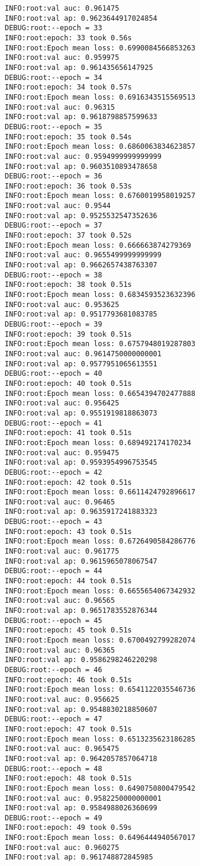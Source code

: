 \documentclass[11pt]{article}
\begin{document}
\begin{verbatim}
INFO:root:val auc: 0.961475
INFO:root:val ap: 0.9623644917024854
DEBUG:root:--epoch = 33
INFO:root:epoch: 33 took 0.56s
INFO:root:Epoch mean loss: 0.6990084566853263
INFO:root:val auc: 0.959975
INFO:root:val ap: 0.961435656147925
DEBUG:root:--epoch = 34
INFO:root:epoch: 34 took 0.57s
INFO:root:Epoch mean loss: 0.6916343515569513
INFO:root:val auc: 0.96315
INFO:root:val ap: 0.9618798857599633
DEBUG:root:--epoch = 35
INFO:root:epoch: 35 took 0.54s
INFO:root:Epoch mean loss: 0.6860063834623857
INFO:root:val auc: 0.9594999999999999
INFO:root:val ap: 0.9603510893478658
DEBUG:root:--epoch = 36
INFO:root:epoch: 36 took 0.53s
INFO:root:Epoch mean loss: 0.6760019958019257
INFO:root:val auc: 0.9544
INFO:root:val ap: 0.9525532547352636
DEBUG:root:--epoch = 37
INFO:root:epoch: 37 took 0.52s
INFO:root:Epoch mean loss: 0.666663874279369
INFO:root:val auc: 0.9655499999999999
INFO:root:val ap: 0.9662657438763307
DEBUG:root:--epoch = 38
INFO:root:epoch: 38 took 0.51s
INFO:root:Epoch mean loss: 0.6834593523632396
INFO:root:val auc: 0.953625
INFO:root:val ap: 0.9517793681083785
DEBUG:root:--epoch = 39
INFO:root:epoch: 39 took 0.51s
INFO:root:Epoch mean loss: 0.6757948019287803
INFO:root:val auc: 0.9614750000000001
INFO:root:val ap: 0.9577951065613551
DEBUG:root:--epoch = 40
INFO:root:epoch: 40 took 0.51s
INFO:root:Epoch mean loss: 0.6654394702477888
INFO:root:val auc: 0.956425
INFO:root:val ap: 0.9551919818863073
DEBUG:root:--epoch = 41
INFO:root:epoch: 41 took 0.51s
INFO:root:Epoch mean loss: 0.689492174170234
INFO:root:val auc: 0.959475
INFO:root:val ap: 0.9593954996753545
DEBUG:root:--epoch = 42
INFO:root:epoch: 42 took 0.51s
INFO:root:Epoch mean loss: 0.6611424792896617
INFO:root:val auc: 0.96465
INFO:root:val ap: 0.9635917241883323
DEBUG:root:--epoch = 43
INFO:root:epoch: 43 took 0.51s
INFO:root:Epoch mean loss: 0.6726490584286776
INFO:root:val auc: 0.961775
INFO:root:val ap: 0.9615965078067547
DEBUG:root:--epoch = 44
INFO:root:epoch: 44 took 0.51s
INFO:root:Epoch mean loss: 0.6655654067342932
INFO:root:val auc: 0.96565
INFO:root:val ap: 0.9651783552876344
DEBUG:root:--epoch = 45
INFO:root:epoch: 45 took 0.51s
INFO:root:Epoch mean loss: 0.6700492799282074
INFO:root:val auc: 0.96365
INFO:root:val ap: 0.9586298246220298
DEBUG:root:--epoch = 46
INFO:root:epoch: 46 took 0.51s
INFO:root:Epoch mean loss: 0.6541122035546736
INFO:root:val auc: 0.956625
INFO:root:val ap: 0.9548830218850607
DEBUG:root:--epoch = 47
INFO:root:epoch: 47 took 0.51s
INFO:root:Epoch mean loss: 0.6513235623186285
INFO:root:val auc: 0.965475
INFO:root:val ap: 0.9642057857064718
DEBUG:root:--epoch = 48
INFO:root:epoch: 48 took 0.51s
INFO:root:Epoch mean loss: 0.6490750800479542
INFO:root:val auc: 0.9582250000000001
INFO:root:val ap: 0.9584988026360699
DEBUG:root:--epoch = 49
INFO:root:epoch: 49 took 0.59s
INFO:root:Epoch mean loss: 0.6496444940567017
INFO:root:val auc: 0.960275
INFO:root:val ap: 0.961748872845985
\end{verbatim}
\end{document}
